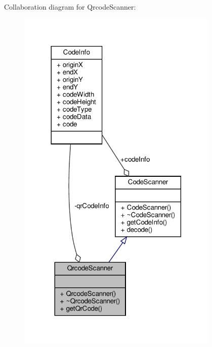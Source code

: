 Collaboration diagram for Qrcode\+Scanner\+:\nopagebreak
\begin{figure}[H]
\begin{center}
\leavevmode
\includegraphics[width=272pt]{class_qrcode_scanner__coll__graph}
\end{center}
\end{figure}
